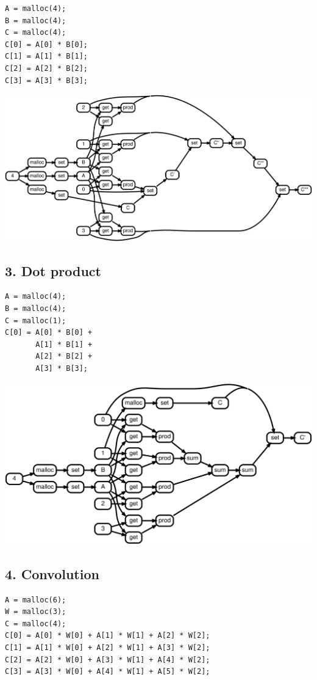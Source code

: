 \documentclass[11pt]{article}
\begin{document}
\begin{lstlisting}
A = malloc(4);
B = malloc(4);
C = malloc(4);
C[0] = A[0] * B[0];
C[1] = A[1] * B[1];
C[2] = A[2] * B[2];
C[3] = A[3] * B[3];
\end{lstlisting}

\includegraphics[scale=0.25]{rtd32}

\pagebreak\subsection*{3. Dot product}

\begin{lstlisting}
A = malloc(4);
B = malloc(4);
C = malloc(1);
C[0] = A[0] * B[0] +
       A[1] * B[1] +
       A[2] * B[2] +
       A[3] * B[3];
\end{lstlisting}

\includegraphics[scale=0.25]{rtd33}

\pagebreak\subsection*{4. Convolution}

\begin{lstlisting}
A = malloc(6);
W = malloc(3);
C = malloc(4);
C[0] = A[0] * W[0] + A[1] * W[1] + A[2] * W[2];
C[1] = A[1] * W[0] + A[2] * W[1] + A[3] * W[2];
C[2] = A[2] * W[0] + A[3] * W[1] + A[4] * W[2];
C[3] = A[3] * W[0] + A[4] * W[1] + A[5] * W[2];
\end{lstlisting}
\end{document}
